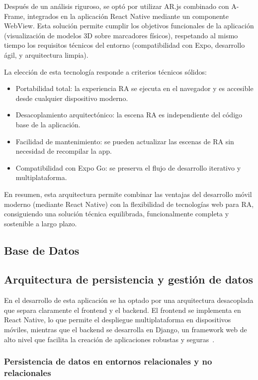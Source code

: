 Después de un análisis riguroso, se optó por utilizar AR.js combinado con A-Frame, integrados en la aplicación React Native mediante un componente WebView. Esta solución permite cumplir los objetivos funcionales de la aplicación (visualización de modelos 3D sobre marcadores físicos), respetando al mismo tiempo los requisitos técnicos del entorno (compatibilidad con Expo, desarrollo ágil, y arquitectura limpia).

La elección de esta tecnología responde a criterios técnicos sólidos:

\begin{itemize}
    \item Portabilidad total: la experiencia RA se ejecuta en el navegador y es accesible desde cualquier dispositivo moderno.
    \item Desacoplamiento arquitectónico: la escena RA es independiente del código base de la aplicación.
    \item Facilidad de mantenimiento: se pueden actualizar las escenas de RA sin necesidad de recompilar la app.
    \item Compatibilidad con Expo Go: se preserva el flujo de desarrollo iterativo y multiplataforma.
\end{itemize}

En resumen, esta arquitectura permite combinar las ventajas del desarrollo móvil moderno (mediante React Native) con la flexibilidad de tecnologías web para RA, consiguiendo una solución técnica equilibrada, funcionalmente completa y sostenible a largo plazo.

\subsection{Base de Datos}

\subsection{Arquitectura de persistencia y gestión de datos}

En el desarrollo de esta aplicación se ha optado por una arquitectura desacoplada que separa claramente el frontend y el backend. El frontend se implementa en React Native, lo que permite el despliegue multiplataforma en dispositivos móviles, mientras que el backend se desarrolla en Django, un framework web de alto nivel que facilita la creación de aplicaciones robustas y seguras~\cite{django2024}.

\subsubsection{Persistencia de datos en entornos relacionales y no relacionales}

